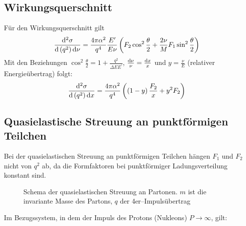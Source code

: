 \documentclass[Ex4_Zusammenfassung.tex]{subfiles}
\begin{document}
\subsection*{Wirkungsquerschnitt}
Für den Wirkungsquerschnitt gilt
\begin{equation}
	\frac{\mathrm{d} ^2\sigma}{\mathrm{d} \left( q^2\right) \mathrm{d} \nu} = \frac{4 \pi \alpha^2}{q^4} \frac{E^\prime}{E\nu}\left( F_2 \cos^2 \frac{\theta}{2} + \frac{2\nu}{M}F_1\sin^2 \frac{\theta}{2} \right) 
\end{equation}
Mit den Beziehungen $\cos^2 \frac{\theta}{2} = 1 + \frac{q^2}{\Delta E E^\prime}$, $\frac{\mathrm{d} \nu}{\nu} = \frac{\mathrm{d} x}{x}$ und $y=\frac{\nu}{E}$ (relativer Energieübertrag) folgt:
\begin{equation}
	\frac{\mathrm{d} ^2 \sigma}{\mathrm{d} \left( q^2\right) \mathrm{d} x} = \frac{4\pi \alpha^2}{q^4} \left( \left( 1-y\right) \frac{F_2}{x} + y^2 F_2\right)
\end{equation}

\subsection*{Quasielastische Streuung an punktförmigen Teilchen}
Bei der quasielastischen Streuung an punktförmigen Teilchen hängen $F_1$ und $F_2$ nicht von $q^2$ ab, da die Formfaktoren bei punktförmiger Ladungsverteilung konstant sind. 
\begin{figure}[H]
	\centering
	\caption{Schema der quasielastischen Streuung an Partonen. $m$ ist die invariante Masse des Partons, $q$ der 4er--Impulsübertrag}
\end{figure}
Im Bezugssystem, in dem der Impuls des Protons (Nukleons) $P \rightarrow \infty$, gilt:
\end{document}
